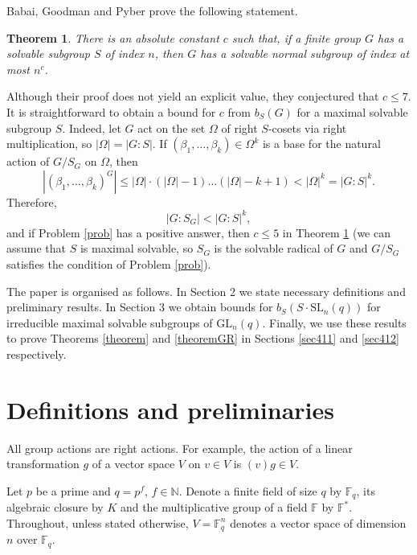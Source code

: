 \documentclass[a4paper,reqno,11pt]{amsart}
\newtheorem{Th}{Theorem}[section]
\theoremstyle{definition}
\theoremstyle{remark}
\numberwithin{equation}{section}
\newcommand{\SL}{{\mathrm{SL}}}
\newcommand{\GL}{{\mathrm{GL}}}
\begin{document}
Babai, Goodman and Pyber \cite{bab}   prove the following statement.
\begin{Th}\label{indexBab}
There is an absolute constant $c$ such that, if a finite group $G$ has a
solvable subgroup $S$ of index $n$, then $G$ has a solvable normal subgroup of index
at most $n^c$.
\end{Th}

\noindent Although their proof does not yield an explicit value, they  conjectured  that $c \le 7$. It is straightforward to obtain a bound for $c$ from $b_S(G)$ for a maximal solvable subgroup $S$.
 Indeed, let  $G$ act on the set $\Omega$ of right $S$-cosets via right multiplication, so $|\Omega|=|G:S|.$  If $(\beta_1 , \ldots , \beta_k )\in \Omega^k$ is a base for the natural action of $G/S_G$ on $\Omega$, then $$|(\beta_1 , \ldots , \beta_k )^G| \le |\Omega| \cdot (|\Omega|-1) \ldots (|\Omega|-k+1)<|\Omega|^k=|G:S|^k.$$
Therefore,
$$|G:S_G|<|G:S|^k,$$
and if Problem \ref{prob} has a positive answer, then $c \le 5$ in Theorem \ref{indexBab} (we can assume that $S$ is maximal solvable, so $S_G$ is the solvable radical of $G$ and $G/S_G$ satisfies the condition of Problem \ref{prob}).

\bigskip







   
    
    The paper is organised as follows. In Section 2 we state necessary definitions and preliminary results. In Section 3 we obtain bounds for $b_S(S \cdot \SL_n(q))$ for irreducible maximal solvable subgroups of $\GL_n(q).$   Finally, we  use these results to prove Theorems \ref{theorem} and \ref{theoremGR} in Sections \ref{sec411} and \ref{sec412} respectively.  

\section{Definitions and preliminaries}\label{secnot}

All group actions are right actions. For example, the action of a linear transformation $g$ of a vector space $V$ on $v \in V$ is $(v)g \in V.$

 Let $p$ be a prime and $q=p^f$,  $f \in \mathbb{N}$. Denote a finite field of size $q$ by $\mathbb{F}_q$, its algebraic closure by $K$ and the multiplicative group of a field $\mathbb{F}$ by $\mathbb{F}^*.$ 
Throughout, unless stated otherwise, $V=\mathbb{F}_{q}^n$ denotes a vector space of dimension $n$ over $\mathbb{F}_{q}$.
\end{document}
